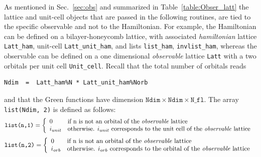 As  mentioned in  Sec.~\ref{sec:obs}  and  summarized in  Table~\ref{table:Obser_latt}   the  lattice  and  unit-cell   objects  that  are  passed  in  the  following  routines,  are  tied  to  the  specific  observable   and  not    to  the  Hamiltonian.     For  example,    the  Hamiltonian   can be  defined on a    bilayer-honeycomb lattice,  with  associated  \textit{hamiltonian} lattice  \texttt{Latt\_ham},  unit-cell  \texttt{Latt\_unit\_ham},   and   lists \texttt{list\_ham}, \texttt{invlist\_ham},  whereas the  observable can be defined  on  a one  dimensional  \textit{observable} lattice  \texttt{Latt} with a   two orbitals per  unit  cell  \texttt{Unit\_cell}.     Recall  that  the  total number of  orbitals  reads
\begin{lstlisting}[style=fortran]
 Ndim  =  Latt_ham%N * Latt_unit_ham%Norb 
\end{lstlisting}
and  that  the  Green  functions  have  dimension  $ \texttt{Ndim}  \times   \texttt{Ndim}   \times   \texttt{N\_fl}  $.      The  array    \texttt{list(Ndim, 2)} is   defined  as  follows:  
\begin{equation}
	  \texttt{list(n,1)} =  
\left\{ 
\begin{array}{ll}
0  &  \text{if  n   is  not  an  orbital of  the  \textit{observable} lattice }   \\
i_{unit}   &  \text{otherwise. }  i_{unit} \text{ corresponds  to  the   unit  cell of the \textit{observable} lattice } 
\end{array}
\right. 	  
\end{equation}
\begin{equation}
	  \texttt{list(n,2)} =  
\left\{ 
\begin{array}{ll}
0    &  \text{if  n   is  not  an  orbital of  the \textit{observable}  lattice }   \\
i_{orb}  &  \text{otherwise. }   i_{orb}  \text{ corresponds  to  the  orbital  of  the \textit{observable}  lattice } 
\end{array}
\right. 	  
\end{equation}

 


